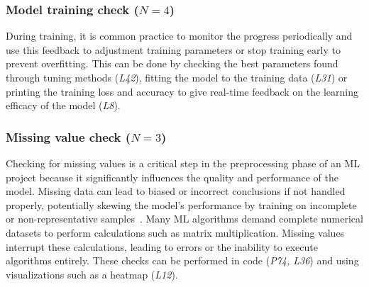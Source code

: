 
\subsubsection{Model training check ($N = 4$)}

During training, it is common practice to monitor the progress periodically and use this feedback to adjustment training parameters or stop training early to prevent overfitting. This can be done by checking the best parameters found through tuning methods (\emph{L42}), fitting the model to the training data (\emph{L31}) or printing the training loss and accuracy to give real-time feedback on the learning efficacy of the model (\emph{L8}).


\subsubsection{Missing value check ($N = 3$)}

Checking for missing values is a critical step in the preprocessing phase of an ML project because it significantly influences the quality and performance of the model. Missing data can lead to biased or incorrect conclusions if not handled properly, potentially skewing the model's performance by training on incomplete or non-representative samples~\cite{shome2022data}. Many ML algorithms demand complete numerical datasets to perform calculations such as matrix multiplication. Missing values interrupt these calculations, leading to errors or the inability to execute algorithms entirely. These checks can be performed in code (\emph{P74, L36}) and using visualizations such as a heatmap (\emph{L12}).


